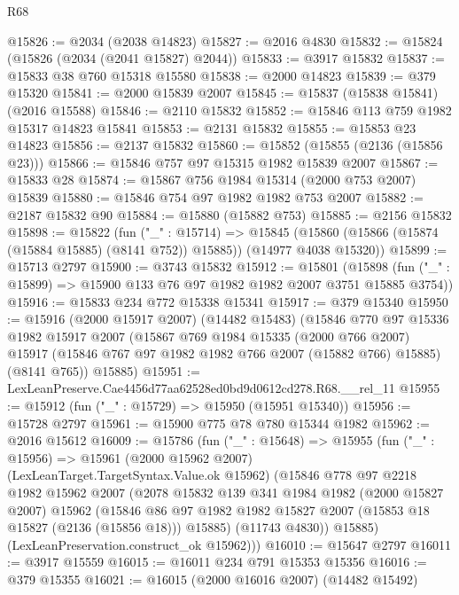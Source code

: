 \begin{lexlean}{R68}
\begin{coremodule}
@15826 := @2034 (@2038 @14823)
@15827 := @2016 @4830
@15832 := @15824 (@15826 (@2034 (@2041 @15827) @2044))
@15833 := @3917 @15832
@15837 := @15833 @38 @760 @15318 @15580
@15838 := @2000 @14823
@15839 := @379 @15320
@15841 := @2000 @15839 @2007
@15845 := @15837 (@15838 @15841) (@2016 @15588)
@15846 := @2110 @15832
@15852 := @15846 @113 @759 @1982 @15317 @14823 @15841
@15853 := @2131 @15832
@15855 := @15853 @23 @14823
@15856 := @2137 @15832
@15860 := @15852 (@15855 (@2136 (@15856 @23)))
@15866 := @15846 @757 @97 @15315 @1982 @15839 @2007
@15867 := @15833 @28
@15874 := @15867 @756 @1984 @15314 (@2000 @753 @2007) @15839
@15880 := @15846 @754 @97 @1982 @1982 @753 @2007
@15882 := @2187 @15832 @90
@15884 := @15880 (@15882 @753)
@15885 := @2156 @15832
@15898 := @15822
    (fun ("_" : @15714) =>
    @15845 (@15860 (@15866 (@15874 (@15884 @15885) (@8141 @752)) @15885)) (@14977 @4038 @15320))
@15899 := @15713 @2797
@15900 := @3743 @15832
@15912 := @15801
    (@15898 (fun ("_" : @15899) => @15900 @133 @76 @97 @1982 @1982 @2007 @3751 @15885 @3754))
@15916 := @15833 @234 @772 @15338 @15341
@15917 := @379 @15340
@15950 := @15916
    (@2000 @15917 @2007)
    (@14482 @15483)
    (@15846
      @770
      @97
      @15336
      @1982
      @15917
      @2007
      (@15867
        @769
        @1984
        @15335
        (@2000 @766 @2007)
        @15917
        (@15846 @767 @97 @1982 @1982 @766 @2007 (@15882 @766) @15885)
        (@8141 @765))
      @15885)
@15951 := LexLeanPreserve.Cae4456d77aa62528ed0bd9d0612cd278.R68.__rel_11
@15955 := @15912 (fun ("_" : @15729) => @15950 (@15951 @15340))
@15956 := @15728 @2797
@15961 := @15900 @775 @78 @780 @15344 @1982
@15962 := @2016 @15612
@16009 := @15786
    (fun ("_" : @15648) =>
    @15955
      (fun ("_" : @15956) =>
      @15961
        (@2000 @15962 @2007)
        (LexLeanTarget.TargetSyntax.Value.ok @15962)
        (@15846
          @778
          @97
          @2218
          @1982
          @15962
          @2007
          (@2078
            @15832
            @139
            @341
            @1984
            @1982
            (@2000 @15827 @2007)
            @15962
            (@15846
              @86
              @97
              @1982
              @1982
              @15827
              @2007
              (@15853 @18 @15827 (@2136 (@15856 @18)))
              @15885)
            (@11743 @4830))
          @15885)
        (LexLeanPreservation.construct_ok @15962)))
@16010 := @15647 @2797
@16011 := @3917 @15559
@16015 := @16011 @234 @791 @15353 @15356
@16016 := @379 @15355
@16021 := @16015 (@2000 @16016 @2007) (@14482 @15492)

\end{coremodule}
\end{lexlean}
